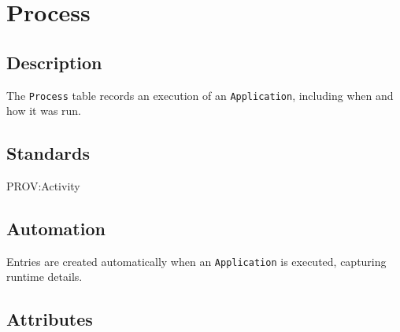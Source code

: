 \documentclass[
]{article}
\begin{document}
\section{Process}\label{process}

\subsection{Description}\label{description-23}

The \texttt{Process} table records an execution of an
\texttt{Application}, including when and how it was run.

\subsection{Standards}\label{standards-25}

PROV:Activity

\subsection{Automation}\label{automation-25}

Entries are created automatically when an \texttt{Application} is
executed, capturing runtime details.

\subsection{Attributes}\label{attributes-22}
\end{document}
